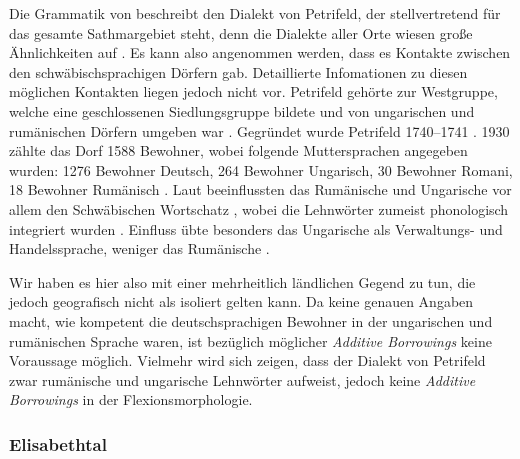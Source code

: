 Die Grammatik von \citet{Moser1937} beschreibt den Dialekt von Petrifeld, der stellvertretend für das gesamte Sathmargebiet steht, denn die Dialekte aller Orte wiesen große Ähnlichkeiten auf \citep[23]{Moser1937}. Es kann also angenommen werden, dass es Kontakte zwischen den schwäbischsprachigen Dörfern gab. Detaillierte Infomationen zu diesen möglichen Kontakten liegen jedoch nicht vor. Petrifeld gehörte zur Westgruppe, welche eine geschlossenen Siedlungsgruppe bildete und von ungarischen und rumänischen Dörfern umgeben war \citep[17]{Moser1937}. Gegründet wurde Petrifeld 1740–1741 \citep[19]{Moser1937}. 1930 zählte das Dorf 1588 Bewohner, wobei folgende Muttersprachen angegeben wurden: 1276 Bewohner Deutsch, 264 Bewohner Ungarisch, 30 Bewohner Romani, 18 Bewohner Rumänisch \citep[61]{Varga2002}. Laut \citet{Moser1937} beeinflussten das Rumänische und Ungarische vor allem den Schwäbischen Wortschatz \citep[102]{Moser1937}, wobei die Lehnwörter zumeist phonologisch integriert wurden \citep[103]{Moser1937}. Einfluss übte besonders das Ungarische als Verwaltungs- und Handelssprache, weniger das Rumänische \citep[103]{Moser1937}.

Wir haben es hier also mit einer mehrheitlich ländlichen Gegend zu tun, die jedoch geografisch nicht als isoliert gelten kann. Da \citet{Moser1937} keine genauen Angaben macht, wie kompetent die deutschsprachigen Bewohner in der ungarischen und rumänischen Sprache waren, ist bezüglich möglicher \textit{Additive Borrowings} keine Voraussage möglich. Vielmehr wird sich zeigen, dass der Dialekt von Petrifeld zwar rumänische und ungarische Lehnwörter aufweist, jedoch keine \textit{Additive Borrowings} in der Flexionsmorphologie.

\subsubsection{Elisabethtal}


